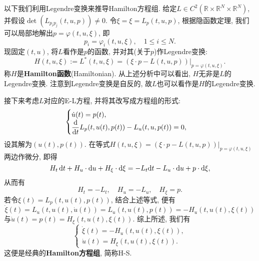 \documentclass[12pt,a4paper]{article}
\begin{document}
以下我们利用Legendre变换来推导Hamilton方程组. 给定$L \in C^2(\mathbb{R} \times \mathbb{R}^N \times \mathbb{R}^N)$, 并假设$\det(L_{p_ip_j}(t, u, p)) \neq 0$.
令$\xi = \xi = L_p(t, u, p)$, 根据隐函数定理, 我们可以局部地解出$p = \varphi(t, u, \xi)$, 即 
\begin{equation*}
    p_i = \varphi_i(t, u, \xi), \quad 1 \leq i \leq N.
\end{equation*} 
现固定$(t, u)$, 将$L$看作是$p$的函数, 并对其(关于$p$)作Legendre变换:
\begin{equation*}
    \boxed{H(t, u, \xi):= L^*(t, u, \xi) = (\xi \cdot p - L(t, u, p))|_{p = \varphi(t, u, \xi)}.}
\end{equation*}
称$H$是\textbf{Hamilton函数}(Hamiltonian). 从上述分析中可以看出, $H$无非是$L$的Legendre变换.
注意到Legendre变换是自反的, 故$L$也可以看作是$H$的Legendre变换.

接下来考虑$L$对应的E-L方程, 并将其改写成方程组的形式:
\begin{equation*}
    \begin{cases} 
        \dot u(t) = p(t), \\  
        \displaystyle\frac{{\rm d}}{{\rm d}t}L_p(t, u(t), p(t)) - L_u(t, u, p(t)) = 0,
    \end{cases}
\end{equation*}
设其解为$(u(t), p(t))$. 在等式$H(t, u, \xi)= \left.(\xi \cdot p - L(t, u, p))\right|_{p = \varphi(t, u, \xi)}$两边作微分, 即得 
\begin{equation*}
    H_t \,{\rm d}t + H_u \cdot {\rm d}u + H_{\xi} \cdot {\rm d}\xi = -L_t {\rm d}t - L_u \cdot {\rm d}u + p \cdot {\rm d}\xi,
\end{equation*}
从而有 
\begin{equation*}
    H_t = -L_t, \quad H_u = -L_u, \quad H_{\xi} = p.
\end{equation*}
若令$\xi(t) = L_p(t, u(t), p(t))$, 结合上述等式, 便有 
\begin{equation*}
    \dot\xi(t) = L_u(t, u(t), \dot u(t)) = L_u(t, u(t), p(t)) = -H_u(t, u(t), \xi(t)) 
\end{equation*}
与$\dot u(t) = p(t) = H_{\xi}(t, u(t), \xi(t))$. 综上所述, 我们有
\begin{equation*}
    \boxed{\begin{cases} 
        \dot\xi(t) = -H_u(t, u(t), \xi(t)), \\ 
        \dot u(t) = H_{\xi}(t, u(t), \xi(t)). 
    \end{cases}}
\end{equation*}
这便是经典的\textbf{Hamilton方程组}, 简称H-S.
\end{document}
